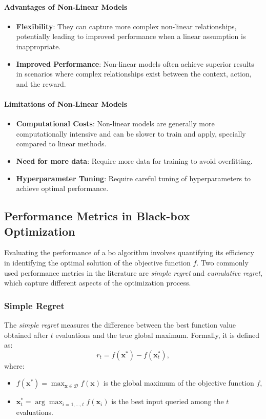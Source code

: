 \paragraph{Advantages of Non-Linear Models}
\begin{itemize}
    \item \textbf{Flexibility}: They can capture more complex non-linear relationships, potentially leading to improved performance when a linear assumption is inappropriate.
    \item \textbf{Improved Performance}: Non-linear models often achieve superior results in scenarios where complex relationships exist between the context, action, and the reward.
\end{itemize}

\paragraph{Limitations of Non-Linear Models}
\begin{itemize}
    \item \textbf{Computational Costs}: Non-linear models are generally more computationally intensive and can be slower to train and apply, specially compared to linear methods.
    \item \textbf{Need for more data}: Require more data for training to avoid overfitting.
    \item \textbf{Hyperparameter Tuning}: Require careful tuning of hyperparameters to achieve optimal performance.
\end{itemize}

\subsection{Performance Metrics in Black-box Optimization}
\label{background:performance_metrics}
Evaluating the performance of a \acf{bo} algorithm involves quantifying its efficiency in identifying the optimal solution of the objective function \( f \). Two commonly used performance metrics in the literature are \emph{simple regret} and \emph{cumulative regret}, which capture different aspects of the optimization process.

\subsubsection{Simple Regret}
The \emph{simple regret} measures the difference between the best function value obtained after \( t \) evaluations and the true global maximum. Formally, it is defined as:
\[
r_t = f(\mathbf{x}^*) - f(\mathbf{x}_t^*),
\]
where:
\begin{itemize}
    \item \( f(\mathbf{x}^*) = \max_{\mathbf{x} \in \mathcal{D}} f(\mathbf{x}) \) is the global maximum of the objective function \( f \),
    \item \( \mathbf{x}_t^* = \arg \max_{i=1,\dots,t} f(\mathbf{x}_i) \) is the best input queried among the \( t \) evaluations.
\end{itemize}

